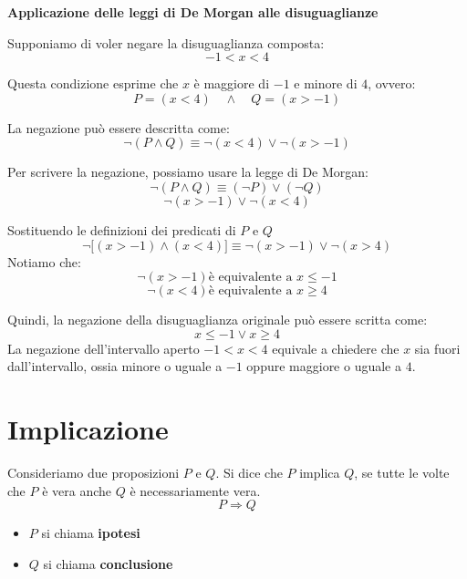 \begin{esempio} \textbf{Applicazione delle leggi di De Morgan alle disuguaglianze}
\medskip

Supponiamo di voler negare la disuguaglianza composta:
\[
-1 < x < 4
\]

Questa condizione esprime che \(x\) è maggiore di $-1$ e minore di $4$, ovvero:
\[
P = (x < 4) \quad \land \quad Q = (x > -1)
\]

La negazione può essere descritta come:
\[
\neg (P \land Q) \equiv \neg (x < 4) \lor \neg (x > -1)
\]

Per scrivere la negazione, possiamo usare la legge di De Morgan:
\[
\neg (P\land Q) \equiv (\neg P) \lor (\neg Q)
\]
\[
\neg (x > -1) \lor \neg (x < 4)
\]

Sostituendo le definizioni dei predicati di \(P\) e \(Q\)
\[
\neg \big[ (x>-1) \land (x<4)\big] \equiv \neg(x>-1) \lor \neg (x>4)
\]
Notiamo che: 
\[
    \neg (x>-1) \text{è equivalente a } x \leq -1
\]
\[
    \neg (x<4) \text{è equivalente a } x \geq 4
\]

Quindi, la negazione della disuguaglianza originale può essere scritta come:
\[
x \leq -1 \lor x \geq 4
\]
La negazione dell'intervallo aperto \(-1 < x < 4\) equivale a chiedere che \(x\) sia fuori dall'intervallo, ossia minore o uguale a \(-1\) oppure maggiore o uguale a \(4\).
\end{esempio}



\section{Implicazione}

Consideriamo due proposizioni $P$ e $Q$. Si dice che $P$ implica $Q$, se tutte le volte che $P$ è vera anche $Q$ è necessariamente vera. 
\[
 P \Rightarrow Q
\]

\begin{itemize}
    \item $P$ si chiama \textbf{ipotesi}
    \item  $Q$ si chiama \textbf{conclusione} 
\end{itemize}

